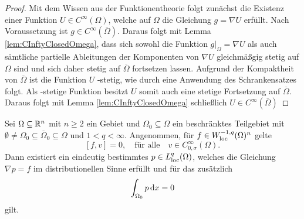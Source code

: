 \begin{proof}
  Mit dem Wissen aus der Funktionentheorie folgt zunächst die Existenz einer Funktion $U \in C^\infty(\Omega)$, welche auf $\Omega$ die Gleichung $g = \nabla U$ erfüllt.
  Nach Voraussetzung ist $g \in C^\infty(\overline\Omega)$.
  Daraus folgt mit Lemma \ref{lem:CInftyClosedOmega}, dass sich sowohl die Funktion $g|_\Omega = \nabla U$ als auch sämtliche partielle Ableitungen der Komponenten von $\nabla U$ gleichmäßgig stetig auf $\Omega$ sind und sich daher stetig auf $\overline\Omega$ fortsetzen lassen.
  Aufgrund der Kompaktheit von $\overline\Omega$ ist die Funktion $U$ \lipschitz\hyp{}stetig, wie durch eine Anwendung des Schrankensatzes folgt.
  Als \lipschitz\hyp{}stetige Funktion besitzt $U$ somit auch eine stetige Fortsetzung auf $\overline\Omega$.
  Daraus folgt mit Lemma \ref{lem:CInftyClosedOmega} schließlich $U \in C^\infty(\overline\Omega)$ 
\end{proof}

\begin{lem}
  \label{lem:gradientCriterion}
  Sei $\Omega \subseteq \mathbb{R}^n$ mit $n \geq 2$ ein Gebiet und $\Omega_0 \subseteq \Omega$ ein beschränktes Teilgebiet mit $\emptyset \neq \Omega_0 \subseteq \overline\Omega_0 \subseteq \Omega$ und $1 < q < \infty$.
  Angenommen, für $f \in W_{\operatorname{loc}}^{-1,q}(\Omega)^n$ gelte
  \begin{equation}
    \label{eq:vKernel}
    [f,v] = 0, \quad \text{für alle} \quad v \in C_{0,\sigma}^\infty(\Omega).
  \end{equation}
  Dann existiert ein eindeutig bestimmtes $p \in L^q_{\operatorname{loc}}(\Omega)$, welches die Gleichung $\nabla p = f$ im distributionellen Sinne erfüllt und für das zusätzlich
  \begin{equation}
    \label{eq:0integral}
    \int_{\Omega_0} p \, {\operatorname{d}\!{x}} = 0
  \end{equation}
  gilt.
\end{lem}

